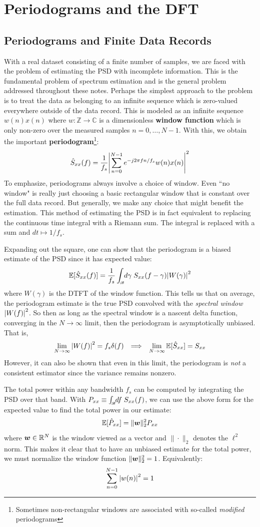 \documentclass[twocolumn]{gwclass}
\newcommand{\R}{\mathbb{R}}
\newcommand{\C}{\mathbb{C}}
\newcommand{\Z}{\mathbb{Z}}
\newcommand{\intbw}[1]{\int_{\hspace{-0.1em}\scriptscriptstyle\mathscr{B}}\hspace{-0.25em}}
\begin{document}
\section{Periodograms and the DFT}
\subsection{Periodograms and Finite Data Records}
With a real dataset consisting of a finite number of samples, we are faced with the problem of estimating the PSD with incomplete information. This is the fundamental problem of spectrum estimation and is the general problem addressed throughout these notes. Perhaps the simplest approach to the problem is to treat the data as belonging to an infinite sequence which is zero-valued everywhere outside of the data record. This is modeled as an infinite sequence $w(n)x(n)$ where $w:\Z\to\C$ is a dimensionless \textbf{window function} which is only non-zero over the measured samples $n=0,\dots,N-1$. With this, we obtain the important \textbf{periodogram}\footnote{Sometimes non-rectangular windows are associated with so-called \emph{modified} periodograms}:
$$\hat{S}_{xx}(f) = \frac{1}{f_s}\abs{\sum_{n=0}^{N-1} e^{-j2\pi f n/f_s} w(n)x(n) }^2 $$
To emphasize, periodograms always involve a choice of window. Even ``no window" is really just choosing a basic rectangular window that is constant over the full data record. But generally, we make any choice that might benefit the estimation. This method of estimating the PSD is in fact equivalent to replacing the continuous time integral with a Riemann sum. The integral is replaced with a sum and $dt\mapsto 1/f_s$.

Expanding out the square, one can show that the periodogram is a biased estimate of the PSD since it has expected value:
$$ \mathbb{E}[\hat{S}_{xx}(f)] = \frac{1}{f_s}\intbw{f_s} d\gamma\;S_{xx}(f-\gamma)\abs{W(\gamma)}^2 $$
where $W(\gamma)$ is the DTFT of the window function. This tells us that on average, the periodogram estimate is the true PSD convolved with the \emph{spectral window} $\abs{W(f)}^2$. So then as long as the spectral window is a nascent delta function, converging in the $N\to\infty$ limit, then the periodogram is asymptotically unbiased. That is,
$$ \lim_{N\to\infty}\abs{W(f)}^2= f_s\delta(f) \:\:\implies\:\: \lim_{N\to\infty}\mathbb{E}[\hat{S}_{xx}] = S_{xx} $$
However, it can also be shown that even in this limit, the periodogram is \emph{not} a consistent estimator since the variance remains nonzero.

The total power within any bandwidth $f_s$ can be computed by integrating the PSD over that band. With $P_{xx}\equiv \intbw{f_s}df\;S_{xx}(f)$, we can use the above form for the expected value to find the total power in our estimate:
$$ \mathbb{E}[\hat{P}_{xx}] =  \|\boldsymbol{w}\|_2^2P_{xx}$$
where $\*w\in \R^N$ is the window viewed as a vector and $\|\cdot\|_2$ denotes the $\ell^2$ norm. This makes it clear that to have an unbiased estimate for the total power, we must normalize the window function $\|\boldsymbol{w}\|_2^2 = 1$. Equivalently:
$$ \sum_{n=0}^{N-1} \abs{w(n)}^2 = 1 $$
\end{document}

